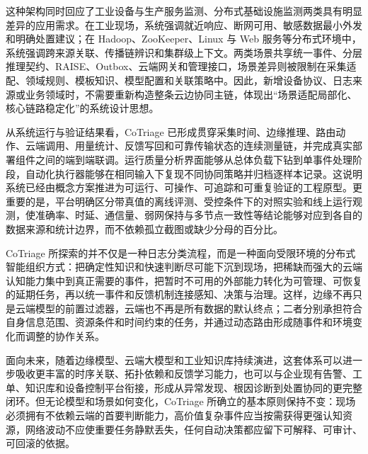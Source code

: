 这种架构同时回应了工业设备与生产服务监测、分布式基础设施监测两类具有明显差异的应用需求。在工业现场，系统强调就近响应、断网可用、敏感数据最小外发和明确处置建议；在 Hadoop、ZooKeeper、Linux 与 Web 服务等分布式环境中，系统强调跨来源关联、传播链辨识和集群级上下文。两类场景共享统一事件、分层推理契约、RAISE、Outbox、云端网关和管理接口，场景差异则被限制在采集适配、领域规则、模板知识、模型配置和关联策略中。因此，新增设备协议、日志来源或业务领域时，不需要重新构造整条云边协同主链，体现出“场景适配局部化、核心链路稳定化”的系统设计思想。

从系统运行与验证结果看，CoTriage 已形成贯穿采集时间、边缘推理、路由动作、云端调用、用量统计、反馈写回和可靠传输状态的连续测量链，并完成真实部署组件之间的端到端联调。运行质量分析界面能够从总体负载下钻到单事件处理阶段，自动化执行器能够在相同输入下复现不同协同策略并归档逐样本记录。这说明系统已经由概念方案推进为可运行、可操作、可追踪和可重复验证的工程原型。更重要的是，平台明确区分带真值的离线评测、受控条件下的对照实验和线上运行观测，使准确率、时延、通信量、弱网保持与多节点一致性等结论能够对应到各自的数据来源和统计边界，而不依赖孤立截图或缺少分母的百分比。

CoTriage 所探索的并不仅是一种日志分类流程，而是一种面向受限环境的分布式智能组织方式：把确定性知识和快速判断尽可能下沉到现场，把稀缺而强大的云端认知能力集中到真正需要的事件，把暂时不可用的外部能力转化为可管理、可恢复的延期任务，再以统一事件和反馈机制连接感知、决策与治理。这样，边缘不再只是云端模型的前置过滤器，云端也不再是所有数据的默认终点；二者分别承担符合自身信息范围、资源条件和时间约束的任务，并通过动态路由形成随事件和环境变化而调整的协作关系。

面向未来，随着边缘模型、云端大模型和工业知识库持续演进，这套体系可以进一步吸收更丰富的时序关联、拓扑依赖和反馈学习能力，也可以与企业现有告警、工单、知识库和设备控制平台衔接，形成从异常发现、根因诊断到处置协同的更完整闭环。但无论模型和场景如何变化，CoTriage 所确立的基本原则保持不变：现场必须拥有不依赖云端的首要判断能力，高价值复杂事件应当按需获得更强认知资源，网络波动不应使重要任务静默丢失，任何自动决策都应留下可解释、可审计、可回滚的依据。
